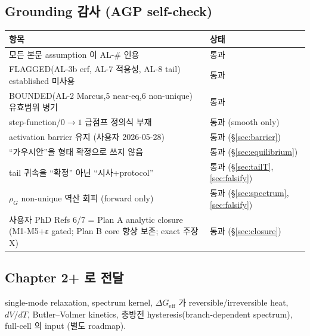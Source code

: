 \documentclass[11pt,a4paper]{article}
\newcommand{\eff}{\mathrm{eff}}
\begin{document}
\subsection{Grounding 감사 (AGP self-check)}
\begin{longtable}{p{} p{}}
\toprule 항목 & 상태 \\ \midrule \endhead
모든 본문 assumption 이 AL-\# 인용 & 통과 \\
FLAGGED(AL-3b erf, AL-7 적용성, AL-8 tail) established 미사용 & 통과 \\
BOUNDED(AL-2 Marcus,5 near-eq,6 non-unique) 유효범위 병기 & 통과 \\
step-function/$0\!\to\!1$ 급점프 정의식 부재 & 통과 (smooth only) \\
activation barrier 유지 (사용자 2026-05-28) & 통과 (\S\ref{sec:barrier}) \\
``가우시안''을 형태 확정으로 쓰지 않음 & 통과 (\S\ref{sec:equilibrium}) \\
tail 귀속을 ``확정'' 아닌 ``시사+protocol'' & 통과 (\S\ref{sec:tailT},\ref{sec:falsify}) \\
$\rho_G$ non-unique 역산 회피 (forward only) & 통과 (\S\ref{sec:spectrum},\ref{sec:falsify}) \\
사용자 PhD Refs 6/7 = Plan A analytic closure (M1-M5+ε gated; Plan B core 항상 보존; exact 주장 X) & 통과 (\S\ref{sec:closure}) \\
\bottomrule
\end{longtable}

\subsection{Chapter 2+ 로 전달}
single-mode relaxation, spectrum kernel, $\Delta G_\eff$ 가 reversible/irreversible heat,
$dV/dT$, Butler--Volmer kinetics, 충방전 hysteresis(branch-dependent spectrum), full-cell
의 input (별도 roadmap).
\end{document}
